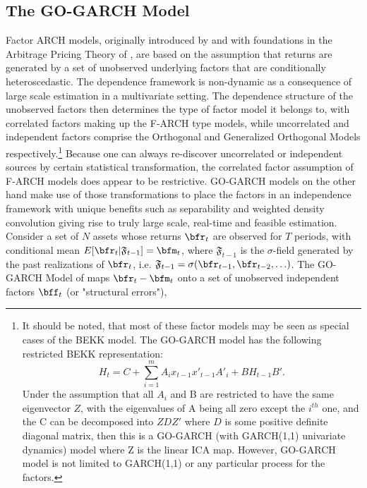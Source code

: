 \subsection{The GO-GARCH Model}\label{section:gogarch}
Factor ARCH models, originally introduced by \cite{Engle1990} and with
foundations in the Arbitrage Pricing Theory of \cite{Ross1976}, are based
on the assumption that returns are generated by a set of unobserved underlying
factors that are conditionally heteroscedastic. The dependence framework is
non-dynamic as a consequence of large scale estimation in a multivariate setting.
The dependence structure of the unobserved factors then determines the type of
factor model it belongs to, with correlated factors making up the F-ARCH type
models, while uncorrelated and independent factors comprise the Orthogonal and
Generalized Orthogonal Models respectively.\footnote{It should be noted, that
most of these factor models may be seen as special cases of the BEKK model.
The GO-GARCH model has the following restricted BEKK representation:
\begin{equation}
{H_t} = C + \sum\limits_{i = 1}^m {{A_i}{x_{t - 1}}{{x'}_{t - 1}}} {{A'}_i} + B{H_{t - 1}}B'.
\end{equation}
Under the assumption that all $A_i$ and B are restricted to have the same
eigenvector $Z$, with the eigenvalues of A being all zero except the $i^{th}$
one, and the C can be decomposed into $ZDZ'$ where $D$ is some positive definite
diagonal matrix, then this is a GO-GARCH (with GARCH(1,1) univariate dynamics)
model where Z is the linear ICA map. However, GO-GARCH model is not limited to
GARCH(1,1) or any particular process for the factors.} Because one can always
re-discover uncorrelated or independent sources by certain statistical transformation,
the correlated factor assumption of F-ARCH models does appear to be restrictive.
GO-GARCH models on the other hand make use of those transformations to place the
factors in an independence framework with unique benefits such as separability
and weighted density convolution giving rise to truly large scale, real-time and
feasible estimation. Consider a set of $N$ assets whose returns \( \bfr_t \) are
observed for $T$ periods, with  conditional mean \(E[\bfr_t|\mathfrak{F}_{t-1}] = \bfm_t\),
where \(\mathfrak{F}_{t-1} \) is the \(\sigma\)-field generated by the past
realizations of \( \bfr_t \), i.e. \( \mathfrak{F}_{t-1} = \sigma(\bfr_{t-1},\bfr_{t-2},\ldots) \).
The GO-GARCH Model of \cite{Weide2002} maps \( \bfr_t  -\bfm_t\) onto a
set of unobserved independent factors \( \bff_t \) (or "structural errors"),
